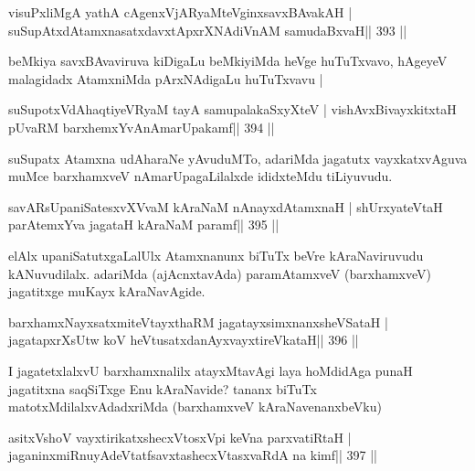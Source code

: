 \begin{shl}
visuPxliMgA yathA cAgenxVjARyaMteV\s ginxsavxBAvakAH |
suSupAtxdAtamxnasatxdavxtApxrXNAdiVnAM samudaBxvaH\hfill || 393 ||
\end{shl}

\begin{artha}
beMkiya savxBAvaviruva kiDigaLu beMkiyiMda heVge huTuTxvavo, hAgeyeV malagidadx AtamxniMda pArxNAdigaLu huTuTxvavu |
\end{artha}

\begin{shl}
suSupotxVdAhaqtiyeVRyaM tayA samupalakaSxyXteV |
vishAvxBivayxkitxtaH pUvaRM barxhemxYvAnAmarUpakamf\hfill || 394 ||
\end{shl}

\begin{artha}
suSupatx Atamxna udAharaNe yAvuduMTo, adariMda jagatutx vayxkatxvAguva muMce barxhamxveV nAmarUpagaLilalxde ididxteMdu tiLiyuvudu.
\end{artha}

\begin{shl}
savARsUpaniSatesxvXVvaM kAraNaM nAnayxdAtamxnaH |
shUrxyateV\s taH parAtemxYva jagataH kAraNaM paramf\hfill || 395 ||
\end{shl}

\begin{artha}
elAlx upaniSatutxgaLalUlx Atamxnanunx biTuTx beVre kAraNaviruvudu  kANuvudilalx. adariMda (ajAcnxtavAda) paramAtamxveV (barxhamxveV) jagatitxge muKayx kAraNavAgide.
\end{artha}


\begin{shl}
barxhamxNayxsatxmiteV\s tayxthaRM jagatayxsimxnanxsheVSataH |
jagatapxrXsUtw koV heVtusatxdanAyxvayxtireVkataH\hfill || 396 ||
\end{shl}

\begin{artha}
I jagatetxlalxvU barxhamxnalilx atayxMtavAgi laya hoMdidAga punaH 
jagatitxna saqSiTxge Enu kAraNavide? tananx biTuTx matotxMdilalxvAdadxriMda (barxhamxveV kAraNavenanxbeVku) 
\end{artha}


\begin{shl}
asitxVshoV vayxtirikatxshecxVtosxV\s pi keVna parxvatiRtaH |
jaganinxmiRnuyAdeVtatfsavxtashecxVtasxvaRdA na kimf\hfill || 397 ||
\end{shl}

